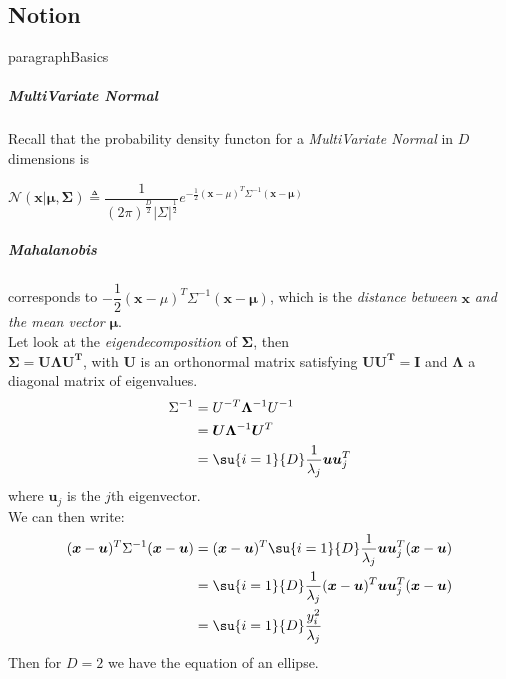 \subsection{Notion}
paragraph{Basics}
\subparagraph{MultiVariate Normal}
Recall that the probability density functon for a \emph{MultiVariate Normal} in $D$ 
dimensions is
\begin{center}
    $\mathcal{N}(\bm{x}|\bm{\mu},\bm{\Sigma}) \triangleq 
    \dfrac{1}{(2\pi)^{\frac{D}{2}}|\Sigma|^\frac{1}{2}}
    e^{-\frac{1}{2}(\bm{x}-\mu)^{T}\Sigma^{-1}(\bm{x}-\bm{\mu})}$
\end{center}

\subparagraph{Mahalanobis}
corresponds to $-\dfrac{1}{2}(\bm{x}-\mu)^{T}\Sigma^{-1}(\bm{x}-\bm{\mu})$, which is 
the \emph{distance between} $\bm{x}$ \emph{and the mean vector} $\bm{\mu}$.\\
Let look at the \emph{eigendecomposition} of $\bm{\Sigma}$, then\\
$\bm{\Sigma} = \bm{U\Lambda U^{T}}$, with $\bm{U}$ is an orthonormal matrix satisfying 
$\bm{UU^{T}} = \bm{I}$ and $\bm{\Lambda}$ a
diagonal matrix of eigenvalues.
\begin{align*}
    \Sigma^{-1} &= U^{-T}\bm{\Lambda}^{-1}U^{-1}\\
                &= \bm{U}\bm{\Lambda}^{-1}\bm{U}^{T}\\
                &= \su{i=1}{D}\frac{1}{\lambda_{j}}\bm{u}\bm{u}_{j}^{T}
\end{align*}
where $\bm{u}_{j}$ is the $j$th eigenvector.\\
We can then write:
\begin{align*}
    (\bm{x}-\bm{u})^{T}\Sigma^{-1}(\bm{x}-\bm{u}) &= 
        (\bm{x}-\bm{u})^{T}\su{i=1}{D}\frac{1}{\lambda_{j}}\bm{u}\bm{u}_{j}^{T}
        (\bm{x}-\bm{u})\\
                                                  &=
    \su{i=1}{D}\frac{1}{\lambda_{j}}(\bm{x}-\bm{u})^{T}\bm{u}\bm{u}_{j}^{T}(\bm{x}-\bm{u})
    \\
                                                  &= 
    \su{i=1}{D}\frac{y_{i}^{2}}{\lambda_{j}}
\end{align*}
Then for $D=2$ we have the equation of an ellipse. 
